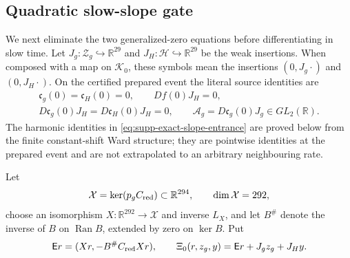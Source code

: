 \documentclass[11pt]{article}
\numberwithin{equation}{section}
\theoremstyle{definition}
\theoremstyle{remark}
\newcommand{\Ran}{\operatorname{Ran}}
\begin{document}
\subsection{Quadratic slow-slope gate}
\label{subsec:supp-exact-slope-gate}

We next eliminate the two generalized-zero equations before differentiating
in slow time.  Let
$J_g:\mathcal Z_g\hookrightarrow\mathbb R^{29}$ and
$J_H:\mathcal H\hookrightarrow\mathbb R^{29}$ be the weak insertions.  When composed with a map on $\mathcal K_0$,
these symbols mean the insertions $(0,J_g\cdot)$ and $(0,J_H\cdot)$.
On the certified prepared event the literal source identities are
\begin{equation}
 \begin{gathered}
 \mathfrak c_g(0)=\mathfrak c_H(0)=0,\qquad Df(0)J_H=0,\\
 D\mathfrak c_g(0)J_H=D\mathfrak c_H(0)J_H=0,\qquad
 \mathcal A_g=D\mathfrak c_g(0)J_g\in GL_2(\mathbb R).
 \end{gathered}
 \label{eq:supp-exact-slope-entrance}
\end{equation}
The harmonic identities in
\eqref{eq:supp-exact-slope-entrance} are proved below from the finite
constant-shift Ward structure; they are pointwise identities at the prepared
event and are not extrapolated to an arbitrary neighbouring rate.

Let
\begin{equation}
 \mathcal X=\ker(p_gC_{\rm red})\subset\mathbb R^{294},
 \qquad \dim\mathcal X=292,
 \label{eq:supp-exact-X-space}
\end{equation}
choose an isomorphism $X:\mathbb R^{292}\to\mathcal X$ and inverse $L_X$,
and let $B^\#$ denote the inverse of $B$ on $\Ran B$, extended by zero on
$\ker B$.  Put
\begin{equation}
 \mathsf E r=(Xr,-B^\#C_{\rm red}Xr),
 \qquad
 \Xi_0(r,z_g,y)=\mathsf E r+J_gz_g+J_Hy.
 \label{eq:supp-exact-linear-critical-coordinates}
\end{equation}
\end{document}
